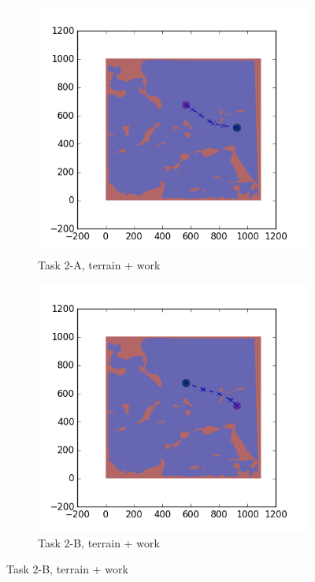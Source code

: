 \documentclass{tamuccthesis}
\begin{document}
\begin{figure}
    \begin{subfigure}[b]{0.4\textwidth}
        \centering
        \includegraphics[width=\textwidth,trim={4cm 3cm 2cm 3cm},clip]{EXP3RG_PathBa_-1_-1_-1_0.png}
        \caption[]{{\small Task 2-A, terrain + work}}    
        \label{fig:Path_2-A_terrain_work}
    \end{subfigure}
    \hfill
    \begin{subfigure}[b]{0.4\textwidth}  
        \centering 
        \includegraphics[width=\textwidth,trim={4cm 3cm 2cm 3cm},clip]{EXP3RG_PathBb_-1_-1_-1_0.png}
        \caption[]{{\small Task 2-B, terrain + work}}   
        \label{fig:Path_2-B_terrain_work}
    \end{subfigure}


\end{figure}
\end{document}
